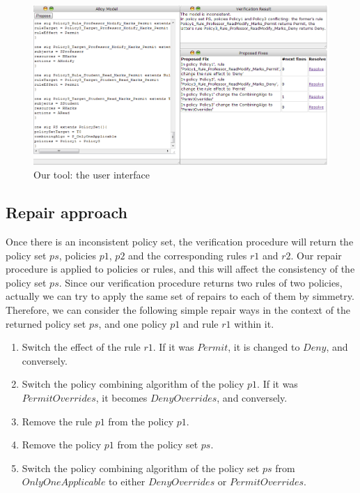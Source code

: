 \documentclass{acm_proc_article-sp}
\begin{document}
\begin{figure}[ht]
\includegraphics[width=\textwidth]{tool.png}
\caption{Our tool: the user interface}    
  \label{fig:tool}
\end{figure}

\subsection{Repair approach}

Once there is an inconsistent policy set, the verification procedure will return the policy set $ps$, policies $p1$, $p2$ and the corresponding rules $r1$ and $r2$. Our repair procedure is applied to policies or rules, and this will affect the consistency of the policy set $ps$. Since our verification procedure returns two rules of two policies, actually we can try to apply the same set of repairs to each of them by simmetry. Therefore, we can consider the following simple repair ways in the context of the returned policy set $ps$, and one policy $p1$ and rule $r1$ within it.

\begin{enumerate}
\item Switch the effect of the rule $r1$. If it was $Permit$, it is changed to $Deny$, and conversely.
\item Switch the policy combining algorithm of the policy $p1$. If it was $PermitOverrides$, it becomes $DenyOverrides$, and conversely.
\item Remove the rule $p1$ from the policy $p1$.
\item Remove the policy $p1$ from the policy set $ps$.
\item Switch the policy combining algorithm of the policy set $ps$ from $OnlyOneApplicable$ to either $DenyOverrides$ or $PermitOverrides$.
\end{enumerate}
\end{document}
